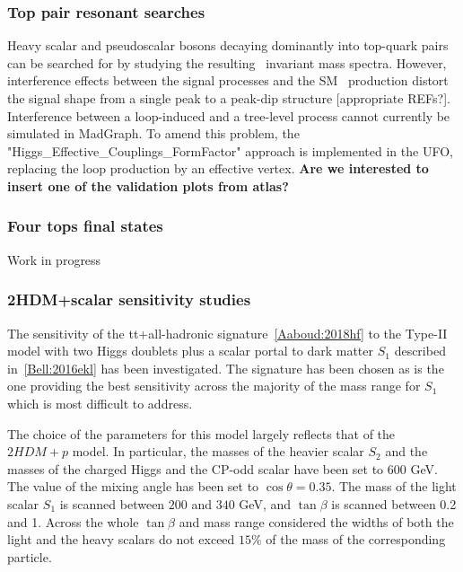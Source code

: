 \subsubsection{Top pair resonant searches}
Heavy scalar and pseudoscalar bosons decaying dominantly into top-quark pairs can be
searched for by studying the resulting \ttbar\ invariant mass
spectra. However, interference effects between the signal processes
and the SM \ttbar\ production distort the signal shape from a single
peak to a peak-dip structure [appropriate REFs?]. Interference between
a loop-induced and a tree-level process cannot currently be simulated in MadGraph.
To amend this problem, the "Higgs\_Effective\_Couplings\_FormFactor"
approach \cite{ttinterfHFF} is implemented in the UFO, replacing the loop production by an
effective vertex.
\textbf{Are we interested to insert one of the validation plots from atlas?}

\subsubsection{Four tops final states}

Work in progress

\subsubsection{2HDM+scalar sensitivity studies}

The sensitivity of the tt+\met all-hadronic signature~\ref{Aaboud:2018hf}
to the Type-II model with two Higgs doublets plus a 
scalar portal to dark matter $S_1$ described in~\ref{Bell:2016ekl} has been investigated.
The signature has been chosen as is the one providing the best sensitivity across the majority of the 
mass range for $S_1$ which is most difficult to address. 

The choice of the parameters for this model largely reflects that of the $2HDM+p$ model.
In particular, the masses of the heavier scalar $S_2$ and the masses of the charged Higgs and the CP-odd
scalar have been set to 600 GeV. The value of the mixing angle has been set to $\cos{\theta}=0.35$. 
The mass of the light scalar $S_1$ is scanned between $200$ and $340$ GeV, and $\tan\beta$ is scanned 
between 0.2 and 1. Across the whole $\tan\beta$ and mass range considered the widths of both the light and the heavy 
scalars do not exceed $15\%$ of the mass of the corresponding particle. 

